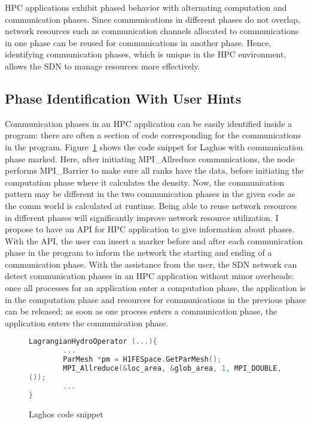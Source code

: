
HPC applications exhibit phased behavior with alternating
computation and communication phases. Since communications in different
phases do not overlap, network resources such as communication channels
allocated to communications in one phase can be reused for communications
in another phase. Hence, identifying communication phases, which is unique
in the HPC environment, allows the SDN to manage resources more effectively.

\subsection{Phase Identification With User Hints}

Communication phases in an HPC application can be easily identified
inside a program: there are often a section of code corresponding
for the communications in the program. Figure~\ref{code.laghos.1}
shows the code snippet for Laghos with communication phase marked. 
Here, after initiating MPI\_Allreduce
communications, the node performs MPI\_Barrier to make sure all ranks 
have the data, before initiating the computation phase where
it calculates the density.
Now, the communication pattern may be different in the two
communication phases in the given code as the comm world is calculated
at runtime. Being able to reuse network resources in different phases will
significantly improve network resource utilization. 
I propose to have an API for HPC application to give
information about phases. With the API, the user can insert a marker before
and after each communication
phase in the program to inform the network the starting and
ending of a communication phase. With the assistance from the user,
the SDN network can detect communication phases in an HPC application
without minor overheads: once all processes for an application
enter a computation phase, the application is in the computation phase and
resources for communications in the previous phase can be released; as
soon as one process enters a communication phase, the application enters
the communication phase. 

\begin{figure}[H]
\begin{lstlisting}[breaklines, language=C++, frame=single, tabsize=4, basicstyle=\ttfamily]
LagrangianHydroOperator (...){
        ...
        ParMesh *pm = H1FESpace.GetParMesh();
        MPI_Allreduce(&loc_area, &glob_area, 1, MPI_DOUBLE, MPI_SUM, pm->GetComm
());
        ...
}
\end{lstlisting}
\caption{Laghos code snippet}
\label{code.laghos.1}
\end{figure}

